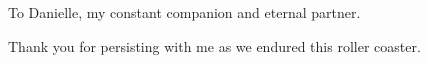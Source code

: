 %
%
%
%

\begin{dedication}
    To Danielle, my constant companion and eternal partner.

    Thank you for persisting with me as we endured this roller coaster.
% 
\end{dedication}

